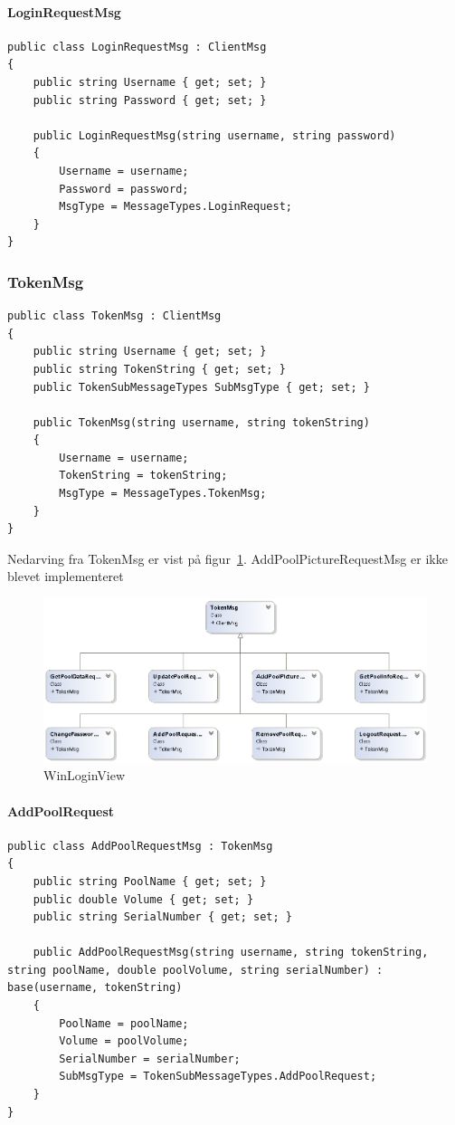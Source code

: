 \paragraph{LoginRequestMsg}
\begin{lstlisting}[caption=LoginRequestMsg, label=code:LoginRequestMsg]
public class LoginRequestMsg : ClientMsg
{
	public string Username { get; set; }
	public string Password { get; set; }
	
	public LoginRequestMsg(string username, string password)
	{
		Username = username;
		Password = password;
		MsgType = MessageTypes.LoginRequest;
	}
}
\end{lstlisting}

\subsubsection{TokenMsg}
\begin{lstlisting}[caption=TokenMsg, label=code:TokenMsg]
public class TokenMsg : ClientMsg
{
	public string Username { get; set; }
	public string TokenString { get; set; }
	public TokenSubMessageTypes SubMsgType { get; set; }
	
	public TokenMsg(string username, string tokenString)
	{
		Username = username;
		TokenString = tokenString;
		MsgType = MessageTypes.TokenMsg;
	}
}
\end{lstlisting}

Nedarving fra TokenMsg er vist på figur~\ref{fig:TokenMsgUML}. AddPoolPictureRequestMsg er ikke blevet implementeret 
\begin{figure}
	\centering
	\includegraphics[width=0.7\linewidth]{figs/connection/TokenMsgUML.png}
	\caption{WinLoginView}
	\label{fig:TokenMsgUML}
\end{figure}

\paragraph{AddPoolRequest}
\begin{lstlisting}[caption=AddPoolRequest, label=code:AddPoolRequest]
public class AddPoolRequestMsg : TokenMsg
{
	public string PoolName { get; set; }
	public double Volume { get; set; }
	public string SerialNumber { get; set; }
	
	public AddPoolRequestMsg(string username, string tokenString, string poolName, double poolVolume, string serialNumber) : base(username, tokenString)
	{
		PoolName = poolName;
		Volume = poolVolume;
		SerialNumber = serialNumber;
		SubMsgType = TokenSubMessageTypes.AddPoolRequest;
	}
}
\end{lstlisting}


